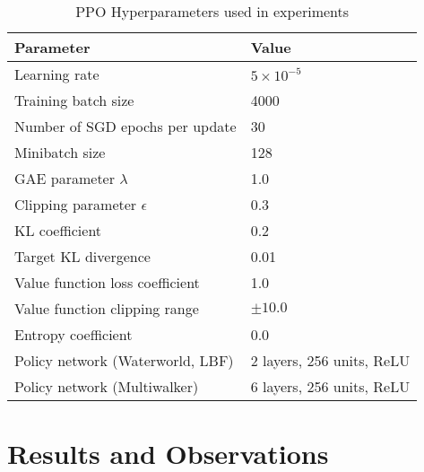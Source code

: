 \documentclass{article}
\begin{document}
\begin{table}[h]
    \centering
    \caption{PPO Hyperparameters used in experiments}
    \begin{tabular}{ll}
    \toprule
    \textbf{Parameter} & \textbf{Value} \\
    \midrule
    Learning rate & $5 \times 10^{-5}$ \\
    Training batch size & 4000 \\
    Number of SGD epochs per update & 30 \\
    Minibatch size & 128 \\
    GAE parameter $\lambda$ & 1.0 \\
    Clipping parameter $\epsilon$ & 0.3 \\
    KL coefficient & 0.2 \\
    Target KL divergence & 0.01 \\
    Value function loss coefficient & 1.0 \\
    Value function clipping range & $\pm 10.0$ \\
    Entropy coefficient & 0.0 \\
    Policy network (Waterworld, LBF) & 2 layers, 256 units, ReLU \\%
    Policy network (Multiwalker) & 6 layers, 256 units, ReLU \\%
    \bottomrule
    \end{tabular}
    \label{tab:ppo-hyperparams}
\end{table}

\FloatBarrier
\section{Results and Observations}
\end{document}
